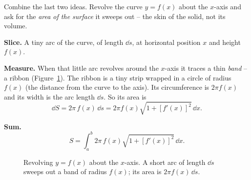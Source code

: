 Combine the last two ideas. Revolve the curve $y=f(x)$ about the $x$-axis and ask
for the \emph{area of the surface} it sweeps out -- the skin of the solid, not its
volume.

\textbf{Slice.} A tiny arc of the curve, of length $\dd s$, at horizontal position
$x$ and height $f(x)$.

\textbf{Measure.} When that little arc revolves around the $x$-axis it traces a
thin \emph{band} -- a ribbon (Figure~\ref{ch26:fig-surface}). The ribbon is a tiny
strip wrapped in a circle of radius $f(x)$ (the distance from the curve to the
axis). Its circumference is
$2\pi f(x)$ and its width is the arc length $\dd s$. So its area is
\[
  \dd S = 2\pi\,f(x)\,\dd s = 2\pi f(x)\sqrt{1+[f'(x)]^2}\,\dd x.
\]

\textbf{Sum.}
\[
  \boxed{\,S = \int_a^b 2\pi\,f(x)\sqrt{1+[f'(x)]^2}\,\dd x.\,}
\]

\begin{figure}[H]
\centering
{}
\caption{Revolving $y=f(x)$ about the $x$-axis. A short arc of length $\dd s$ sweeps
out a band of radius $f(x)$; its area is $2\pi f(x)\,\dd s$.}
\label{ch26:fig-surface}
\end{figure}

